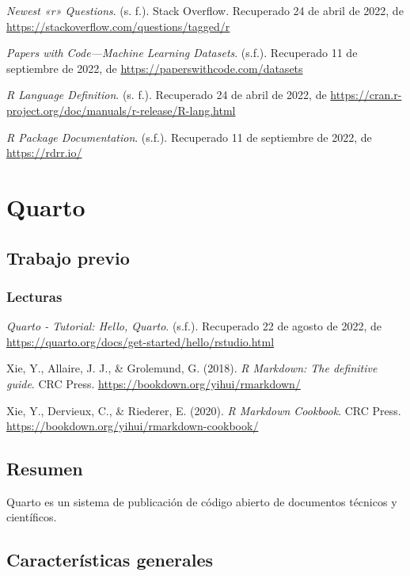 \documentclass[
  letterpaper,
  DIV=11,
  numbers=noendperiod]{scrreprt}
\begin{document}
\emph{Newest «r» Questions}. (s. f.). Stack Overflow. Recuperado 24 de
abril de 2022, de \url{https://stackoverflow.com/questions/tagged/r}

\emph{Papers with Code---Machine Learning Datasets}. (s.f.). Recuperado
11 de septiembre de 2022, de \url{https://paperswithcode.com/datasets}

\emph{R Language Definition}. (s. f.). Recuperado 24 de abril de 2022,
de \url{https://cran.r-project.org/doc/manuals/r-release/R-lang.html}

\emph{R Package Documentation}. (s.f.). Recuperado 11 de septiembre de
2022, de \url{https://rdrr.io/}

\hypertarget{quarto}{%
\chapter{Quarto}\label{quarto}}

\hypertarget{trabajo-previo-5}{%
\section{Trabajo previo}\label{trabajo-previo-5}}

\hypertarget{lecturas-3}{%
\subsection{Lecturas}\label{lecturas-3}}

\emph{Quarto - Tutorial: Hello, Quarto}. (s.f.). Recuperado 22 de agosto
de 2022, de \url{https://quarto.org/docs/get-started/hello/rstudio.html}

Xie, Y., Allaire, J. J., \& Grolemund, G. (2018). \emph{R Markdown: The
definitive guide}. CRC Press.
\url{https://bookdown.org/yihui/rmarkdown/}

Xie, Y., Dervieux, C., \& Riederer, E. (2020). \emph{R Markdown
Cookbook}. CRC Press.
\url{https://bookdown.org/yihui/rmarkdown-cookbook/}

\hypertarget{resumen-4}{%
\section{Resumen}\label{resumen-4}}

Quarto es un sistema de publicación de código abierto de documentos
técnicos y científicos.

\hypertarget{caracteruxedsticas-generales-1}{%
\section{Características
generales}\label{caracteruxedsticas-generales-1}}
\end{document}

